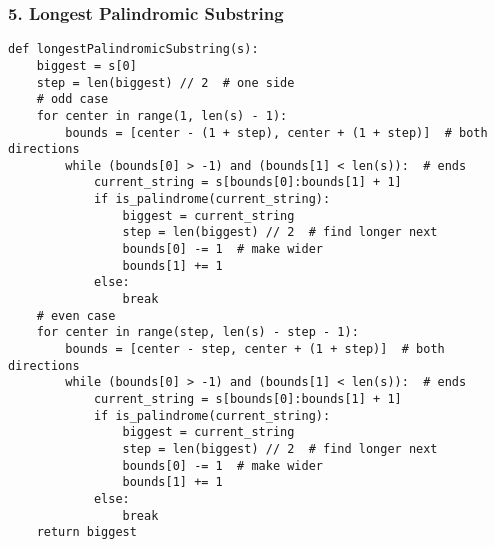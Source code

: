 \begin{frame}[fragile]\frametitle{5. Longest Palindromic Substring}

		\begin{lstlisting}[basicstyle=\scriptsize]
def longestPalindromicSubstring(s):
    biggest = s[0]
    step = len(biggest) // 2  # one side
    # odd case
    for center in range(1, len(s) - 1):
        bounds = [center - (1 + step), center + (1 + step)]  # both directions
        while (bounds[0] > -1) and (bounds[1] < len(s)):  # ends
            current_string = s[bounds[0]:bounds[1] + 1]
            if is_palindrome(current_string):
                biggest = current_string
                step = len(biggest) // 2  # find longer next
                bounds[0] -= 1  # make wider
                bounds[1] += 1
            else:
                break
    # even case
    for center in range(step, len(s) - step - 1):
        bounds = [center - step, center + (1 + step)]  # both directions
        while (bounds[0] > -1) and (bounds[1] < len(s)):  # ends
            current_string = s[bounds[0]:bounds[1] + 1]
            if is_palindrome(current_string):
                biggest = current_string
                step = len(biggest) // 2  # find longer next
                bounds[0] -= 1  # make wider
                bounds[1] += 1
            else:
                break
    return biggest
		\end{lstlisting}		

\end{frame}


